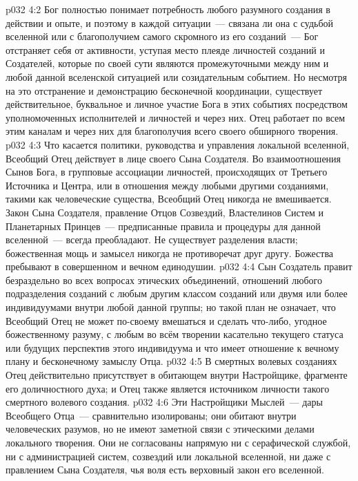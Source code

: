 \vs p032 4:2 Бог полностью понимает потребность любого разумного создания в действии и опыте, и поэтому в каждой ситуации~--- связана ли она с судьбой вселенной или с благополучием самого скромного из его созданий~--- Бог отстраняет себя от активности, уступая место плеяде личностей созданий и Создателей, которые по своей сути являются промежуточными между ним и любой данной вселенской ситуацией или созидательным событием. Но несмотря на это отстранение и демонстрацию бесконечной координации, существует действительное, буквальное и личное участие Бога в этих событиях посредством уполномоченных исполнителей и личностей и через них. Отец работает по всем этим каналам и через них для благополучия всего своего обширного творения.
\vs p032 4:3 \pc Что касается политики, руководства и управления локальной вселенной, Всеобщий Отец действует в лице своего Сына Создателя. Во взаимоотношения Сынов Бога, в групповые ассоциации личностей, происходящих от Третьего Источника и Центра, или в отношения между любыми другими созданиями, такими как человеческие существа, Всеобщий Отец никогда не вмешивается. Закон Сына Создателя, правление Отцов Созвездий, Властелинов Систем и Планетарных Принцев~--- предписанные правила и процедуры для данной вселенной~--- всегда преобладают. Не существует разделения власти; божественная мощь и замысел никогда не противоречат друг другу. Божества пребывают в совершенном и вечном единодушии.
\vs p032 4:4 Сын Создатель правит безраздельно во всех вопросах этических объединений, отношений любого подразделения созданий с любым другим классом созданий или двумя или более индивидуумами внутри любой данной группы; но такой план не означает, что Всеобщий Отец не может по\hyp{}своему вмешаться и сделать что\hyp{}либо, угодное божественному разуму, с любым  во всём творении касательно текущего статуса или будущих перспектив этого индивидуума и что имеет отношение к вечному плану и бесконечному замыслу Отца.
\vs p032 4:5 \pc В смертных волевых созданиях Отец действительно присутствует в обитающем внутри Настройщике, фрагменте его доличностного духа; и Отец также является источником личности такого смертного волевого создания.
\vs p032 4:6 \pc Эти Настройщики Мыслей~--- дары Всеобщего Отца~--- сравнительно изолированы; они обитают внутри человеческих разумов, но не имеют заметной связи с этическими делами локального творения. Они не согласованы напрямую ни с серафической службой, ни с администрацией систем, созвездий или локальной вселенной, ни даже с правлением Сына Создателя, чья воля есть верховный закон его вселенной.
